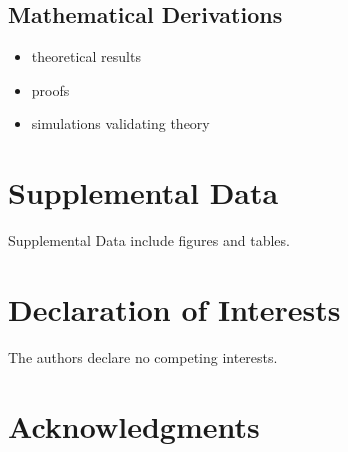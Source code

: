 \documentclass[12pt]{article}
\newcommand{\add}[1]{{\color{red}{[... #1 ...]}}}
\begin{document}
\subsection{Mathematical Derivations}

\begin{itemize}
\item theoretical results
\item proofs
\item simulations validating theory
\end{itemize}


\newpage
\section*{Supplemental Data}


Supplemental Data include \add{??} figures and \add{??} tables.



\section*{Declaration of Interests}


The authors declare no competing interests.


\section*{Acknowledgments}

\end{document}
